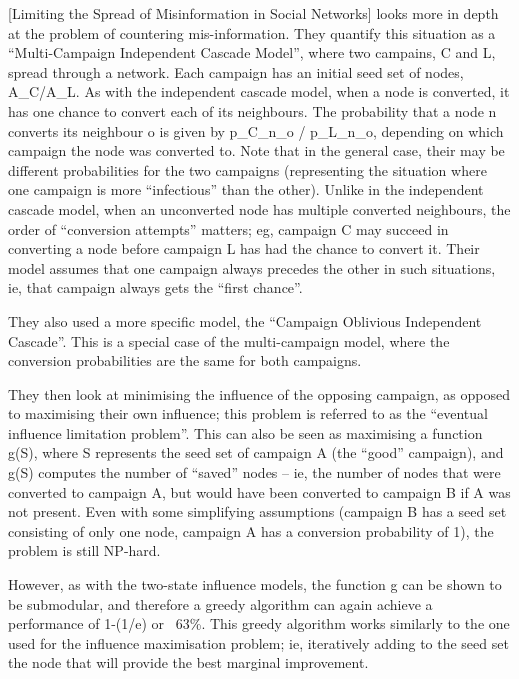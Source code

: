 [Limiting the Spread of Misinformation in Social Networks] looks more in depth at the problem of countering mis-information. They quantify this situation as a ``Multi-Campaign Independent Cascade Model'', where two campains, C and L, spread through a network. Each campaign has an initial seed set of nodes, A\_C/A\_L. As with the independent cascade model, when a node is converted, it has one chance to convert each of its neighbours. The probability that a node n converts its neighbour o is given by p\_C\_n\_o / p\_L\_n\_o, depending on which campaign the node was converted to. Note that in the general case, their may be different probabilities for the two campaigns (representing the situation where one campaign is more ``infectious'' than the other). Unlike in the independent cascade model, when an unconverted node has multiple converted neighbours, the order of ``conversion attempts'' matters; eg, campaign C may succeed in converting a node before campaign L has had the chance to convert it. Their model assumes that one campaign always precedes the other in such situations, ie, that campaign always gets the ``first chance''.

They also used a more specific model, the ``Campaign Oblivious Independent Cascade''. This is a special case of the multi-campaign model, where the conversion probabilities are the same for both campaigns.

They then look at minimising the influence of the opposing campaign, as opposed to maximising their own influence; this problem is referred to as the ``eventual influence limitation problem''. This can also be seen as maximising a function g(S), where S represents the seed set of campaign A (the ``good'' campaign), and g(S) computes the number of ``saved'' nodes -- ie, the number of nodes that were converted to campaign A, but would have been converted to campaign B if A was not present. Even with some simplifying assumptions (campaign B has a seed set consisting of only one node, campaign A has a conversion probability of 1), the problem is still NP-hard.

However, as with the two-state influence models, the function g can be shown to be submodular, and therefore a greedy algorithm can again achieve a performance of 1-(1/e) or ~63\%. This greedy algorithm works similarly to the one used for the influence maximisation problem; ie, iteratively adding to the seed set the node that will provide the best marginal improvement.

